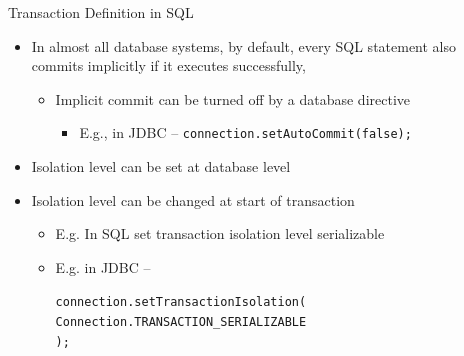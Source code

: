 \documentclass{beamer}
\begin{document}

\begin{frame}{Transaction Definition in SQL}
    \begin{itemize}
        \item In almost all database systems, by default, every SQL statement also commits implicitly if it executes successfully,
            \begin{itemize}
                \item Implicit commit can be turned off by a database directive
                    \begin{itemize}
                        \item E.g., in JDBC -- \texttt{connection.setAutoCommit(false);}
                    \end{itemize}

            \end{itemize}
        \item Isolation level can be set at database level
        \item Isolation level can be changed at start of transaction
            \begin{itemize}
                \item E.g. In SQL set transaction isolation level serializable
                \item E.g. in JDBC -- \\
                    \begin{scriptsize}
                \texttt{connection.setTransactionIsolation(} \\
                \quad \texttt{Connection.TRANSACTION\_SERIALIZABLE} \\
                \texttt{);}
                    \end{scriptsize}

            \end{itemize}
    \end{itemize}
\end{frame}
\end{document}

